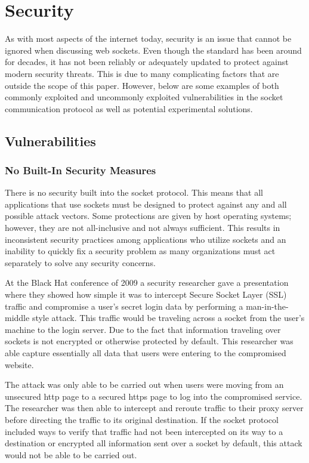 \documentclass[conference, 12pt]{IEEEtran}
\begin{document}
\section{Security}
As with most aspects of the internet today, security is an issue that cannot be ignored when discussing web sockets. Even though the standard has been around for decades, it has not been reliably or adequately updated to protect against modern security threats. This is due to many complicating factors that are outside the scope of this paper. However, below are some examples of both commonly exploited and uncommonly exploited vulnerabilities in the socket communication protocol as well as potential experimental solutions.

\subsection{Vulnerabilities}

\subsubsection{No Built-In Security Measures}
There is no security built into the socket protocol. This means that all applications that use sockets must be designed to protect against any and all possible attack vectors. Some protections are given by host operating systems; however, they are not all-inclusive and not always sufficient. This results in inconsistent security practices among applications who utilize sockets and an inability to quickly fix a security problem as many organizations must act separately to solve any security concerns.

At the Black Hat conference of 2009 a security researcher gave a presentation where they showed how simple it was to intercept Secure Socket Layer (SSL) traffic and compromise a user’s secret login data by performing a man-in-the-middle style attack\cite{Sheble}. This traffic would be traveling across a socket from the user’s machine to the login server. Due to the fact that information traveling over sockets is not encrypted or otherwise protected by default. This researcher was able capture essentially all data that users were entering to the compromised website.

The attack was only able to be carried out when users were moving from an unsecured http page to a secured https page to log into the compromised service. The researcher was then able to intercept and reroute traffic to their proxy server before directing the traffic to its original destination\cite{Sheble}. If the socket protocol included ways to verify that traffic had not been intercepted on its way to a destination or encrypted all information sent over a socket by default, this attack would not be able to be carried out.
\end{document}
